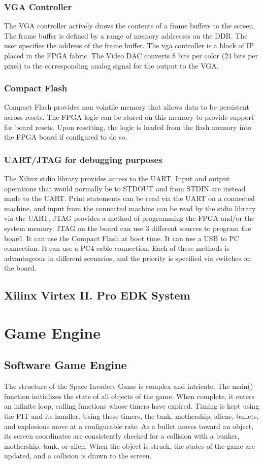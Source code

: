 \documentclass[11pt,letter,oneside]{report}
\begin{document}
     	\subsubsection{VGA Controller}
		The VGA controller actively draws the contents of a frame buffers to the screen. The frame buffer is defined by a range of memory addresses on the DDR. The user specifies the address of the frame buffer. The vga controller is a block of IP placed in the FPGA fabric. The Video DAC converts 8 bits per color (24 bits per pixel) to the corresponding analog signal for the output to the VGA.
	\subsubsection{Compact Flash}
		Compact Flash provides non volatile memory that allows data to be persistent across resets. The FPGA logic can be stored on this memory to provide support for board resets. Upon resetting, the logic is loaded from the flash memory into the FPGA board if configured to do so.
	\subsubsection{UART/JTAG for debugging purposes}
		The Xilinx stdio library provides access to the UART.  Input and output operations that would normally be to STDOUT and from STDIN are instead made to the UART.  Print statements can be read via the UART on a connected machine,  and input from the connected machine can be read by the stdio library via the UART.  JTAG provides a method of programming the FPGA and/or the system memory.  JTAG on the board can use 3 different sources to program the board.  It can use the Compact Flash at boot time.  It can use a USB to PC connection.  It can use a PC4 cable connection.  Each of these methods is advantageous in different scenarios, and the priority is specified via switches on the board.

\subsection{Xilinx Virtex II. Pro EDK System}

\section{Game Engine }

\subsection{Software Game Engine}
The structure of the Space Invaders Game is complex and intricate. The main() function initializes the state of all objects of the game. When complete, it enters an infinite loop, calling functions whose timers have expired. Timing is kept using the PIT and its handler. Using these timers, the tank, mothership, aliens, bullets, and explosions move at a configurable rate. As a bullet moves toward an object, its screen coordinates are consistently checked for a collision with a bunker, mothership, tank, or alien. When the object is struck, the states of the game are updated, and a collision is drawn to the screen.
\end{document}

